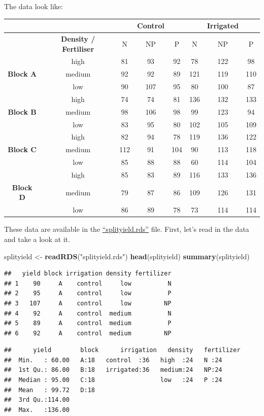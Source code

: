 \documentclass[]{book}
\newenvironment{Shaded}{\begin{snugshade}}{\end{snugshade}}
\newcommand{\KeywordTok}[1]{\textcolor[rgb]{0.13,0.29,0.53}{\textbf{#1}}}
\newcommand{\StringTok}[1]{\textcolor[rgb]{0.31,0.60,0.02}{#1}}
\newcommand{\NormalTok}[1]{#1}
\theoremstyle{definition}
\theoremstyle{definition}
\theoremstyle{definition}
\theoremstyle{remark}
\begin{document}
\newpage

The data look like:

\begin{longtable}[]{@{}cccccccc@{}}
\toprule
~ & ~ & ~ & Control & ~ & ~ & Irrigated & ~\tabularnewline
\midrule
\endhead
& \textbf{Density / Fertiliser} & N & NP & P & N & NP & P\tabularnewline
& high & 81 & 93 & 92 & 78 & 122 & 98\tabularnewline
\textbf{Block A} & medium & 92 & 92 & 89 & 121 & 119 &
110\tabularnewline
& low & 90 & 107 & 95 & 80 & 100 & 87\tabularnewline
& high & 74 & 74 & 81 & 136 & 132 & 133\tabularnewline
\textbf{Block B} & medium & 98 & 106 & 98 & 99 & 123 & 94\tabularnewline
& low & 83 & 95 & 80 & 102 & 105 & 109\tabularnewline
& high & 82 & 94 & 78 & 119 & 136 & 122\tabularnewline
\textbf{Block C} & medium & 112 & 91 & 104 & 90 & 113 &
118\tabularnewline
& low & 85 & 88 & 88 & 60 & 114 & 104\tabularnewline
& high & 85 & 83 & 89 & 116 & 133 & 136\tabularnewline
\textbf{Block D} & medium & 79 & 87 & 86 & 109 & 126 &
131\tabularnewline
& low & 86 & 89 & 78 & 73 & 114 & 114\tabularnewline
\bottomrule
\end{longtable}

These data are available in the
\href{https://exeter-data-analytics.github.io/StatModelling/_data/splityield.rds}{``splityield.rds''}
file. First, let's read in the data and take a look at it.

\begin{Shaded}
\begin{Highlighting}[]
\NormalTok{splityield <-}\StringTok{ }\KeywordTok{readRDS}\NormalTok{(}\StringTok{"splityield.rds"}\NormalTok{)}
\KeywordTok{head}\NormalTok{(splityield)}
\KeywordTok{summary}\NormalTok{(splityield)}
\end{Highlighting}
\end{Shaded}

\begin{verbatim}
##   yield block irrigation density fertilizer
## 1    90     A    control     low          N
## 2    95     A    control     low          P
## 3   107     A    control     low         NP
## 4    92     A    control  medium          N
## 5    89     A    control  medium          P
## 6    92     A    control  medium         NP
\end{verbatim}

\begin{verbatim}
##      yield        block      irrigation   density   fertilizer
##  Min.   : 60.00   A:18   control  :36   high  :24   N :24     
##  1st Qu.: 86.00   B:18   irrigated:36   medium:24   NP:24     
##  Median : 95.00   C:18                  low   :24   P :24     
##  Mean   : 99.72   D:18                                        
##  3rd Qu.:114.00                                               
##  Max.   :136.00
\end{verbatim}
\end{document}

